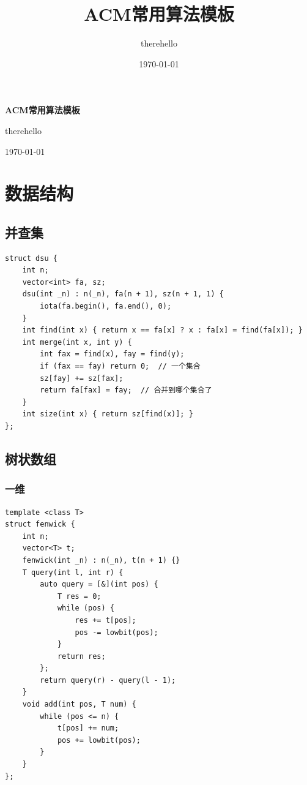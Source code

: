 \documentclass[UTF8]{ctexart}
\title{ACM常用算法模板}
\author{therehello}
\date{\today}
\newcommand\blankpage{
    \null
    \thispagestyle{empty}
    \addtocounter{page}{-1}
    \newpage
}
\begin{document}
\begin{sloppypar}

\begin{titlepage}
    \centering
    {\fontsize{40pt}{0pt}\selectfont \textbf{ACM常用算法模板}\par} %
    \vfill %
    {\fontsize{12pt}{0pt}\selectfont therehello\par} %
    \today %
\end{titlepage}

\blankpage

\tableofcontents

\clearpage

\section{数据结构}

\subsection{并查集}

\begin{lstlisting}[style=cpp]
struct dsu {
    int n;
    vector<int> fa, sz;
    dsu(int _n) : n(_n), fa(n + 1), sz(n + 1, 1) {
        iota(fa.begin(), fa.end(), 0);
    }
    int find(int x) { return x == fa[x] ? x : fa[x] = find(fa[x]); }
    int merge(int x, int y) {
        int fax = find(x), fay = find(y);
        if (fax == fay) return 0;  // 一个集合
        sz[fay] += sz[fax];
        return fa[fax] = fay;  // 合并到哪个集合了
    }
    int size(int x) { return sz[find(x)]; }
};
\end{lstlisting}

\subsection{树状数组}

\subsubsection{一维}

\begin{lstlisting}[style=cpp]
template <class T>
struct fenwick {
    int n;
    vector<T> t;
    fenwick(int _n) : n(_n), t(n + 1) {}
    T query(int l, int r) {
        auto query = [&](int pos) {
            T res = 0;
            while (pos) {
                res += t[pos];
                pos -= lowbit(pos);
            }
            return res;
        };
        return query(r) - query(l - 1);
    }
    void add(int pos, T num) {
        while (pos <= n) {
            t[pos] += num;
            pos += lowbit(pos);
        }
    }
};
\end{lstlisting}


\end{sloppypar}
\end{document}

